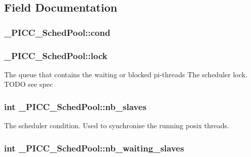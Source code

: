 \subsection{Field Documentation}
\hypertarget{struct__PICC__SchedPool_ad146af14a9d5b8c490ae0a5579d59da1}{
\subsubsection[{cond}]{ \-\_\-\-P\-I\-C\-C\-\_\-\-Sched\-Pool\-::cond}}\label{struct__PICC__SchedPool_ad146af14a9d5b8c490ae0a5579d59da1}
\hypertarget{struct__PICC__SchedPool_ab322b207c03204dfc4b2afd5a19e32cf}{
\subsubsection[{lock}]{ \-\_\-\-P\-I\-C\-C\-\_\-\-Sched\-Pool\-::lock}}\label{struct__PICC__SchedPool_ab322b207c03204dfc4b2afd5a19e32cf}
The queue that contains the waiting or blocked pi-\/threads The scheduler lock. T\-O\-D\-O see spec \hypertarget{struct__PICC__SchedPool_a911d4f57e6a2cefd736d4cfd3a94b435}{
\subsubsection[{nb\-\_\-slaves}]{\setlength{\rightskip}{0pt plus 5cm}int \-\_\-\-P\-I\-C\-C\-\_\-\-Sched\-Pool\-::nb\-\_\-slaves}}\label{struct__PICC__SchedPool_a911d4f57e6a2cefd736d4cfd3a94b435}
The scheduler condition. Used to synchronise the running posix threads. \hypertarget{struct__PICC__SchedPool_ae78e0ed1fcc5953008c184b02840f3b7}{
\subsubsection[{nb\-\_\-waiting\-\_\-slaves}]{\setlength{\rightskip}{0pt plus 5cm}int \-\_\-\-P\-I\-C\-C\-\_\-\-Sched\-Pool\-::nb\-\_\-waiting\-\_\-slaves}}\label{struct__PICC__SchedPool_ae78e0ed1fcc5953008c184b02840f3b7}

